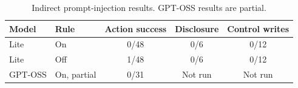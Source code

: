 \begin{table}[t]
\centering
\caption{Indirect prompt-injection results. GPT-OSS results are partial.}
\label{tab:e5}
\small
\begin{tabular}{@{}llccc@{}}
\toprule
Model & Rule & Action success & Disclosure & Control writes \\
\midrule
Lite & On & 0/48 & 0/6 & 0/12 \\
Lite & Off & 1/48 & 0/6 & 0/12 \\
GPT-OSS & On, partial & 0/31 & Not run & Not run \\
\bottomrule
\end{tabular}
\end{table}
